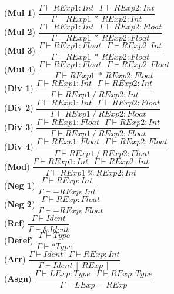 \documentclass[12pt]{article}
\begin{document}
\begin{center}
\noindent(\textbf{Mul 1})
$\dfrac{\Gamma \vdash RExp1:Int\ \ \ \Gamma \vdash RExp2:Int}{\Gamma \vdash RExp1\ *\ RExp2:Int}$\\[0.1in]
\noindent(\textbf{Mul 2})
$\dfrac{\Gamma \vdash RExp1:Int\ \ \ \Gamma \vdash RExp2:Float}{\Gamma \vdash RExp1\ *\ RExp2:Float}$\\[0.1in]
\noindent(\textbf{Mul 3})
$\dfrac{\Gamma \vdash RExp1:Float\ \ \ \Gamma \vdash RExp2:Int}{\Gamma \vdash RExp1\ *\ RExp2:Float}$\\[0.1in]
\noindent(\textbf{Mul 4})
$\dfrac{\Gamma \vdash RExp1:Float\ \ \ \Gamma \vdash RExp2:Float}{\Gamma \vdash RExp1\ *\ RExp2:Float}$\\[0.1in]

\noindent(\textbf{Div 1})
$\dfrac{\Gamma \vdash RExp1:Int\ \ \ \Gamma \vdash RExp2:Int}{\Gamma \vdash RExp1\ /\ RExp2:Int}$\\[0.1in]
\noindent(\textbf{Div 2})
$\dfrac{\Gamma \vdash RExp1:Int\ \ \ \Gamma \vdash RExp2:Float}{\Gamma \vdash RExp1\ /\ RExp2:Float}$\\[0.1in]
\noindent(\textbf{Div 3})
$\dfrac{\Gamma \vdash RExp1:Float\ \ \ \Gamma \vdash RExp2:Int}{\Gamma \vdash RExp1\ /\ RExp2:Float}$\\[0.1in]
\noindent(\textbf{Div 4})
$\dfrac{\Gamma \vdash RExp1:Float\ \ \ \Gamma \vdash RExp2:Float}{\Gamma \vdash RExp1\ /\ RExp2:Float}$\\[0.1in]
\noindent(\textbf{Mod})
$\dfrac{\Gamma \vdash RExp1:Int\ \ \ \Gamma \vdash RExp2:Int}{\Gamma \vdash RExp1\ \%\ RExp2:Int}$\\[0.1in]
\noindent(\textbf{Neg 1})
$\dfrac{\Gamma \vdash RExp:Int}{\Gamma \vdash -RExp:Int}$\\[0.1in]
\noindent(\textbf{Neg 2})
$\dfrac{\Gamma \vdash RExp:Float}{\Gamma \vdash -RExp:Float}$\\[0.1in]

\noindent(\textbf{Ref})
$\dfrac{\Gamma \vdash Ident}{\Gamma \vdash \text{\&} Ident}$\\[0.1in]
\noindent(\textbf{Deref})
$\dfrac{\Gamma \vdash Type}{\Gamma \vdash \text{*} Type}$\\[0.1in]
\noindent(\textbf{Arr})
$\dfrac{\Gamma \vdash Ident\ \ \ \Gamma \vdash RExp:Int}{\Gamma \vdash Ident\ [\ RExp\ ]}$\\[0.1in]

\noindent(\textbf{Asgn})
$\dfrac{\Gamma \vdash LExp:Type\ \ \ \Gamma \vdash RExp:Type}{\Gamma \vdash LExp = RExp}$\\[0.1in]


\end{center}
\end{document}

